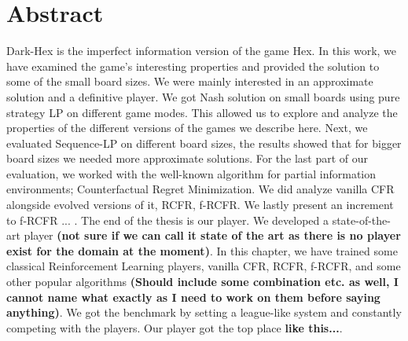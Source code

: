 \thispagestyle{acknowledgements}
\section*{Abstract}

Dark-Hex is the imperfect information version of the game Hex. In this work, we have examined the game's interesting properties and provided the solution to some of the small board sizes.
We were mainly interested in an approximate solution and a definitive player. We got Nash solution on small boards using pure strategy LP on different game modes.
This allowed us to explore and analyze the properties of the different versions of the games we describe here.
Next, we evaluated Sequence-LP on different board sizes, the results showed that for bigger board sizes we needed more approximate solutions.
For the last part of our evaluation, we worked with the well-known algorithm for partial information environments; Counterfactual Regret Minimization. We did analyze vanilla CFR alongside evolved versions of it, RCFR, f-RCFR. We lastly present an increment to f-RCFR \appendName ... \appendDifferences.
The end of the thesis is our player. We developed a state-of-the-art player \textbf{(not sure if we can call it state of the art as there is no player exist for the domain at the moment)}.
In this chapter, we have trained some classical Reinforcement Learning players, vanilla CFR, RCFR, f-RCFR, \appendName and some other popular algorithms \textbf{(Should include some combination etc. as well, I cannot name what exactly as I need to work on them before saying anything)}. We got the benchmark by setting a league-like system and constantly competing with the players.
Our player \appendName got the top place \textbf{like this...}.

